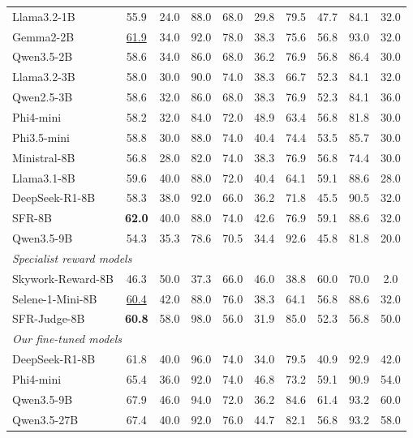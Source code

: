 \documentclass{article}
\theoremstyle{plain}
\theoremstyle{definition}
\theoremstyle{remark}
\begin{document}
\begin{table}[t]
\begin{tabular}{lccccccccc}
Llama3.2-1B    & 55.9 & 24.0 & 88.0 & 68.0 & 29.8 & 79.5 & 47.7 & 84.1 & 32.0 \\
Gemma2-2B      & \underline{61.9} & 34.0 & 92.0 & 78.0 & 38.3 & 75.6 & 56.8 & 93.0 & 32.0 \\
Qwen3.5-2B     & 58.6 & 34.0 & 86.0 & 68.0 & 36.2 & 76.9 & 56.8 & 86.4 & 30.0 \\
Llama3.2-3B    & 58.0 & 30.0 & 90.0 & 74.0 & 38.3 & 66.7 & 52.3 & 84.1 & 32.0 \\
Qwen2.5-3B     & 58.6 & 32.0 & 86.0 & 68.0 & 38.3 & 76.9 & 52.3 & 84.1 & 36.0 \\
Phi4-mini      & 58.2 & 32.0 & 84.0 & 72.0 & 48.9 & 63.4 & 56.8 & 81.8 & 30.0 \\
Phi3.5-mini    & 58.8 & 30.0 & 88.0 & 74.0 & 40.4 & 74.4 & 53.5 & 85.7 & 30.0 \\
Ministral-8B   & 56.8 & 28.0 & 82.0 & 74.0 & 38.3 & 76.9 & 56.8 & 74.4 & 30.0 \\
Llama3.1-8B    & 59.6 & 40.0 & 88.0 & 72.0 & 40.4 & 64.1 & 59.1 & 88.6 & 28.0 \\
DeepSeek-R1-8B & 58.3 & 38.0 & 92.0 & 66.0 & 36.2 & 71.8 & 45.5 & 90.5 & 32.0 \\
SFR-8B         & \textbf{62.0} & 40.0 & 88.0 & 74.0 & 42.6 & 76.9 & 59.1 & 88.6 & 32.0 \\
Qwen3.5-9B & 54.3 & 35.3 & 78.6 & 70.5 & 34.4 & 92.6 & 45.8 & 81.8 & 20.0 \\
\midrule
\multicolumn{10}{l}{\textit{Specialist reward models}} \\
Skywork-Reward-8B   & 46.3 & 50.0 & 37.3 & 66.0 & 46.0 & 38.8 & 60.0 & 70.0 & 2.0 \\
Selene-1-Mini-8B & \underline{60.4} & 42.0 & 88.0 & 76.0 & 38.3 & 64.1 & 56.8 & 88.6 & 32.0 \\
SFR-Judge-8B   & \textbf{60.8} & 58.0 & 98.0 & 56.0 & 31.9 & 85.0 & 52.3 & 56.8 & 50.0 \\
\midrule
\multicolumn{10}{l}{\textit{Our fine-tuned models}} \\
DeepSeek-R1-8B & 61.8 & 40.0 & 96.0 & 74.0 & 34.0 & 79.5 & 40.9 & 92.9 & 42.0 \\
Phi4-mini      & 65.4 & 36.0 & 92.0 & 74.0 & 46.8 & 73.2 & 59.1 & 90.9 & 54.0 \\
Qwen3.5-9B     & 67.9 & 46.0 & 94.0 & 72.0 & 36.2 & 84.6 & 61.4 & 93.2 & 60.0 \\
Qwen3.5-27B    & 67.4 & 40.0 & 92.0 & 76.0 & 44.7 & 82.1 & 56.8 & 93.2 & 58.0 \\

\end{tabular}
\end{table}
\end{document}
